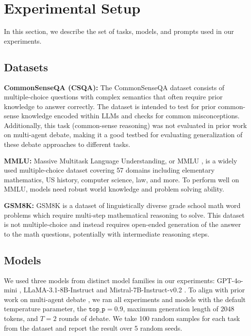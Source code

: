 \documentclass{article}
\begin{document}
\section{Experimental Setup}

In this section, we describe the set of tasks, models, and prompts used in our experiments.

\subsection{Datasets}

\textbf{CommonSenseQA (CSQA):} The CommonSenseQA dataset \citep{commonsenseqa} consists of multiple-choice questions with complex semantics that often require prior knowledge to answer correctly. The dataset is intended to test for prior common-sense knowledge encoded within LLMs and checks for common misconceptions. Additionally, this task (common-sense reasoning) was not evaluated in prior work on multi-agent debate, making it a good testbed for evaluating generalization of these debate approaches to different tasks. 

\textbf{MMLU:} Massive Multitask Language Understanding, or MMLU \citep{mmlu}, is a widely used multiple-choice dataset covering 57 domains including elementary mathematics, US history, computer science, law, and more. To perform well on MMLU, models need robust world knowledge and problem solving ability.

\textbf{GSM8K:} GSM8K \citep{gsm8k} is a dataset of linguistically diverse grade school math word problems which require multi-step mathematical reasoning to solve. This dataset is not multiple-choice and instead requires open-ended generation of the answer to the math questions, potentially with intermediate reasoning steps.

\subsection{Models}

We used three models from distinct model families in our experiments: GPT-4o-mini \citep{openai2024gpt4omini}, LLaMA-3.1-8B-Instruct \citep{llama3} and Mistral-7B-Instruct-v0.2 \citep{mistral}. To align with prior work on multi-agent debate \citep{du2023improvingfactualityreasoninglanguage, subramaniam2025multiagent}, we ran all experiments and models with the default temperature parameter, the $\texttt{top\_p} = 0.9$, maximum generation length of $2048$ tokens, and $T=2$ rounds of debate.
We take 100 random samples for each task from the dataset and report the result over 5 random seeds.
\end{document}
